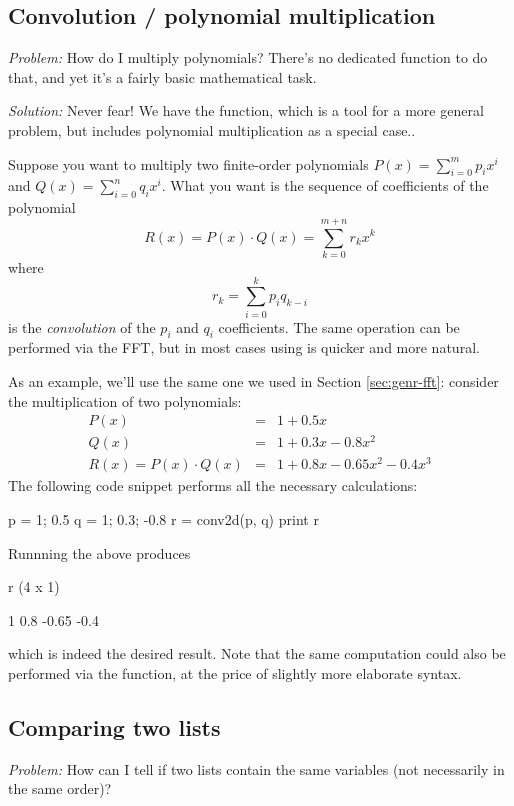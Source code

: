 \subsection{Convolution / polynomial multiplication}

\emph{Problem:} How do I multiply polynomials? There's no dedicated
function to do that, and yet it's a fairly basic mathematical task.

\emph{Solution:} Never fear! We have the  function, which
is a tool for a more general problem, but includes polynomial
multiplication as a special case..

Suppose you want to multiply two finite-order polynomials $P(x) =
\sum_{i=0}^m p_i x^i$ and $Q(x) = \sum_{i=0}^n q_i x^i$. What you want
is the sequence of coefficients of the polynomial
\[
  R(x) = P(x) \cdot Q(x) = \sum_{k=0}^{m+n} r_k x^k
\]
where
\[
  r_k = \sum_{i=0}^k p_i q_{k-i}
\]
is the \emph{convolution} of the $p_i$ and $q_i$ coefficients. The
same operation can be performed via the FFT, but in most cases using
 is quicker and more natural.

As an example, we'll use the same one we used in Section
\ref{sec:genr-fft}: consider the multiplication of two polynomials:
\begin{eqnarray*}
  P(x) & = & 1 + 0.5 x \\
  Q(x) & = & 1 + 0.3 x - 0.8 x^2 \\
  R(x) = P(x) \cdot Q(x) & = & 1 + 0.8 x - 0.65 x^2 - 0.4 x^3
\end{eqnarray*}
The following code snippet performs all the necessary calculations:
\begin{code}
p = {1; 0.5}
q = {1; 0.3; -0.8}
r = conv2d(p, q)
print r
\end{code}
Runnning the above produces
\begin{code}
r (4 x 1)

      1
    0.8
  -0.65
   -0.4
\end{code}
which is indeed the desired result. Note that the same computation
could also be performed via the  function, at the price of
slightly more elaborate syntax.

\subsection{Comparing two lists}

\emph{Problem:} How can I tell if two lists contain the same variables
(not necessarily in the same order)?

